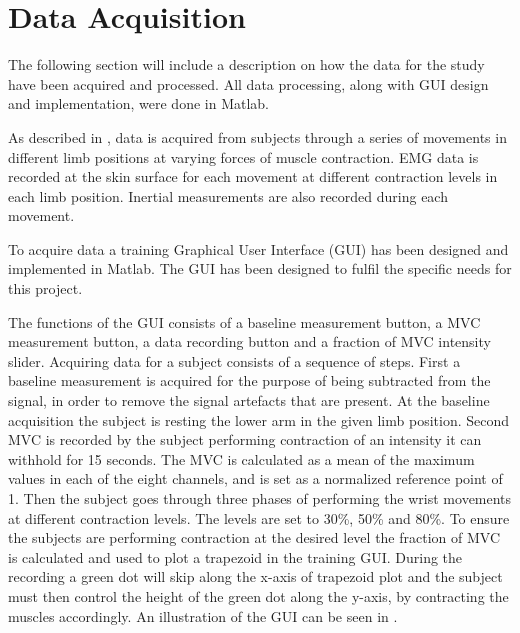 \section{Data Acquisition} \label{sec:dataAcquisition}

The following section will include a description on how the data for the study have been acquired and processed. All data processing, along with GUI design and implementation, were done in Matlab.

As described in , data is acquired from subjects through a series of movements in different limb positions at varying forces of muscle contraction. EMG data is recorded at the skin surface for each movement at different contraction levels in each limb position. Inertial measurements are also recorded during each movement. 

To acquire data a training Graphical User Interface (GUI) has been designed and implemented in Matlab. The GUI has been designed to fulfil the specific needs for this project. 

The functions of the GUI consists of a baseline measurement button, a MVC measurement button, a data recording button and a fraction of MVC intensity slider. Acquiring data for a subject consists of a sequence of steps. First a baseline measurement is acquired for the purpose of being subtracted from the signal, in order to remove the signal artefacts that are present. At the baseline acquisition the subject is resting the lower arm in the given limb position. 
Second MVC is recorded by the subject performing contraction of an intensity it can withhold for 15 seconds. The MVC is calculated as a mean of the maximum values in each of the eight channels, and is set as a normalized reference point of 1.
Then the subject goes through three phases of performing the wrist movements at different contraction levels. The levels are set to 30\%, 50\% and 80\%. To ensure the subjects are performing contraction at the desired level the fraction of MVC is calculated and used to plot a trapezoid in the training GUI. During the recording a green dot will skip along the x-axis of trapezoid plot and the subject must then control the height of the green dot along the y-axis, by contracting the muscles accordingly.
An illustration of the GUI can be seen in . 

